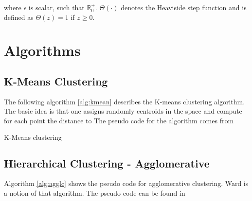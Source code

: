 \documentclass[12pt,a4paper,bibliography=totocnumbered,listof=totocnumbered]{scrartcl}
\begin{document}
{\begin{appendix}
where $\epsilon$ is scalar, such that $\mathbb{R}^+_0$. $\Theta(\cdot)$ denotes the Heaviside step function and is defined as $\Theta(z) = 1$ if $z\ge0$.
 
\pagebreak
\section{Algorithms}

\subsection{K-Means Clustering}

The following algorithm \ref{alg:kmean} describes the K-means clustering algorithm. The basic idea is that one assigns randomly centroids in the space and compute for each point the distance to  The pseudo code for the algorithm comes from \cite{Murphy2012}
\IncMargin{1em}
\begin{algorithm}
	\BlankLine
	\caption{K-Means clustering}
	\label{alg:kmean}
\end{algorithm}\DecMargin{1em}
\subsection{Hierarchical Clustering - Agglomerative}
Algorithm \ref{alg:agglc} shows the pseudo code for agglomerative clustering. Ward is a notion of that algorithm. The pseudo code can be found in \cite{Murphy2012}


\end{appendix}}
\end{document}
